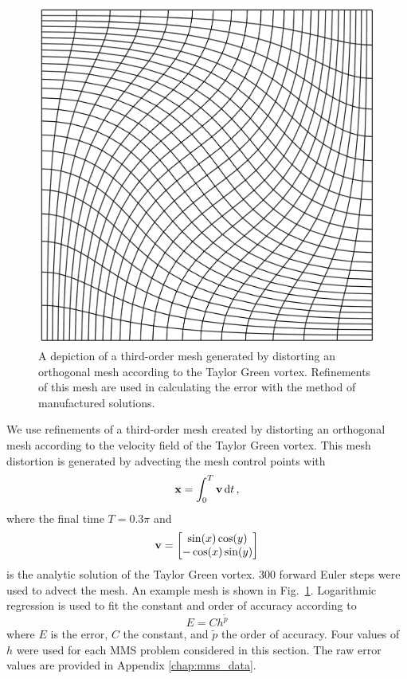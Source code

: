 \documentclass[../doc.tex]{subfiles}
\begin{document}
\begin{figure}
\centering
\includegraphics[width=.35\textwidth]{data/img/tgmesh0.3.png}
\caption{A depiction of a third-order mesh generated by distorting an orthogonal mesh according to the Taylor Green vortex. Refinements of this mesh are used in calculating the error with the method of manufactured solutions.}
\label{smm:tgmesh}
\end{figure}
We use refinements of a third-order mesh created by distorting an orthogonal mesh according to the velocity field of the Taylor Green vortex. This mesh distortion is generated by advecting the mesh control points with 
	\begin{equation}
		\boldsymbol{\mathrm{x}} = \int_0^T \boldsymbol{\mathrm{v}} \mathop{}\!\mathrm{d} t \,,
	\end{equation}
where the final time $T=0.3\pi$ and 
	\begin{equation}
		\boldsymbol{\mathrm{v}} = \begin{bmatrix} 
			\sin(x) \cos(y) \\ 
			-\cos(x) \sin(y) 
		\end{bmatrix}
	\end{equation}
is the analytic solution of the Taylor Green vortex. 300 forward Euler steps were used to advect the mesh. An example mesh is shown in Fig.~\ref{smm:tgmesh}. Logarithmic regression is used to fit the constant and order of accuracy according to 
	\begin{equation}
		E = C h^{\tilde{p}}
	\end{equation}
where $E$ is the error, $C$ the constant, and $\tilde{p}$ the order of accuracy. Four values of $h$ were used for each MMS problem considered in this section. 
The raw error values are provided in Appendix \ref{chap:mms_data}. 
\end{document}
